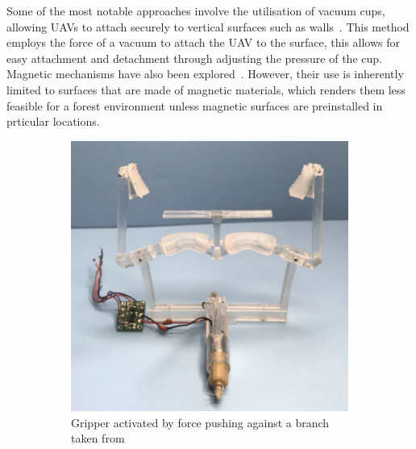 Some of the most notable approaches involve the utilisation of vacuum cups, allowing UAVs to attach securely to vertical surfaces such as walls~\cite{perching-vertical-surface}.
This method employs the force of a vacuum to attach the UAV to the surface, this allows for easy attachment and detachment through adjusting the pressure of the cup.
Magnetic mechanisms have also been explored~\cite{perching-magnets}.
However, their use is inherently limited to surfaces that are made of magnetic materials, which renders them less feasible for a forest environment unless magnetic surfaces are preinstalled in prticular locations.

\begin{figure}[ht]
  \centering
  \begin{subfigure}[b]{0.45\textwidth}
      \centering
      \includegraphics[width=\textwidth]{background/perching-gripper1.png}
      \caption{Gripper activated by force pushing against a branch taken from~\cite{perching-gripper1}}
      \label{fig:perching-gripper1}
  \end{subfigure}
  \hfill
  \begin{subfigure}[b]{0.45\textwidth}
      \centering

\end{subfigure}
\end{figure}

